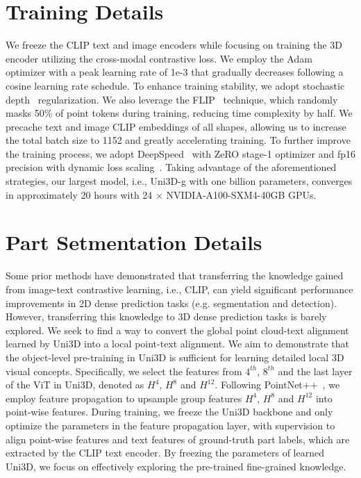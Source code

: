 \documentclass{article} \usepackage{iclr2024_conference,times}
\def\Ours{Uni3D\xspace}
\begin{document}
\section{Training Details}
\label{sec.m4}
We freeze the CLIP text and image encoders while focusing on training the 3D encoder utilizing the cross-modal contrastive loss. We employ the Adam~\citep{kingma2014adam} optimizer with a peak learning rate of 1e-3 that gradually decreases following a cosine learning rate schedule. To enhance training stability, we adopt stochastic depth~\citep{huang2016deep} regularization.
We also leverage the FLIP~\citep{li2023scaling} technique, which randomly masks 50\% of point tokens during training, reducing time complexity by half. 
We precache text and image CLIP embeddings of all shapes, allowing us to increase the total batch size to 1152 and greatly accelerating training. To further improve the training process, we adopt DeepSpeed~\citep{rasley2020deepspeed} with ZeRO stage-1 optimizer and fp16 precision with dynamic loss scaling~\citep{rajbhandari2020zero}. 
Taking advantage of the aforementioned strategies, our largest model, i.e., Uni3D-g with one billion parameters, converges in approximately 20 hours with 24 $\times$ NVIDIA-A100-SXM4-40GB GPUs.




\section{Part Setmentation Details}
\label{sec.appendP}
Some prior methods \citep{rao2022denseclip,yang2022lavt} have demonstrated that transferring the knowledge gained from image-text contrastive learning, i.e., CLIP, can yield significant performance improvements in 2D dense prediction tasks (e.g. segmentation and detection). However, transferring this knowledge to 3D dense prediction tasks is barely explored. We seek to find a way to convert the global point cloud-text alignment learned by \Ours into a local point-text alignment. We aim to demonstrate that the object-level  pre-training in \Ours is sufficient for learning detailed local 3D visual concepts. 
Specifically, we select the features from $4^{th}$, $8^{th}$ and the last layer of the ViT in \Ours, denoted as $H^{4}$, $H^{8}$ and $H^{12}$. Following PointNet++~\citep{qi2017pointnet++}, we employ feature propagation to upsample group features $H^{4}$, $H^{8}$ and $H^{12}$ into point-wise features. During training, we freeze the \Ours backbone and only optimize the parameters in the feature propagation layer, with supervision to align point-wise features and text features of ground-truth part labels, which are extracted by the CLIP text encoder. 
By freezing the parameters of learned \Ours, we focus on effectively exploring the pre-trained fine-grained knowledge.
\end{document}
